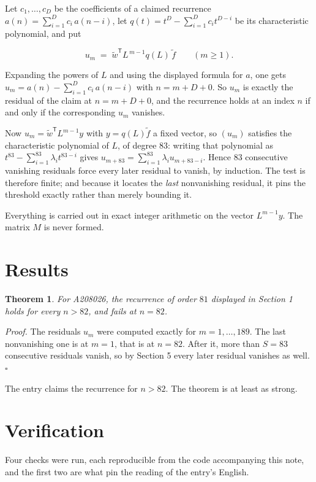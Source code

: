 \documentclass[11pt]{article}
\newtheorem{theorem}{Theorem}
\theoremstyle{definition}
\begin{document}
Let $c_1,\dots,c_D$ be the coefficients of a claimed recurrence $a(n) = \sum_{i=1}^{D} c_i\,a(n-i)$, let $q(t) = t^{D} - \sum_{i=1}^{D} c_i t^{D-i}$ be its characteristic polynomial, and put

\[u_m \;=\; \tilde w^{\mathsf T} L^{\,m-1} q(L)\,\tilde f \qquad (m \ge 1).\]

Expanding the powers of $L$ and using the displayed formula for $a$, one gets $u_m = a(n) - \sum_{i=1}^{D} c_i\,a(n-i)$ with $n = m + D + 0$. So $u_m$ is exactly the residual of the claim at $n = m + D + 0$, and the recurrence holds at an index $n$ if and only if the corresponding $u_m$ vanishes.

Now $u_m = \tilde w^{\mathsf T} L^{m-1} y$ with $y = q(L)\tilde f$ a fixed vector, so $(u_m)$ satisfies the characteristic polynomial of $L$, of degree $83$: writing that polynomial as $t^{83} - \sum_{i=1}^{83} \lambda_i t^{83-i}$ gives $u_{m+83} = \sum_{i=1}^{83} \lambda_i u_{m+83-i}$. Hence $83$ consecutive vanishing residuals force every later residual to vanish, by induction. The test is therefore finite; and because it locates the {\itshape last} nonvanishing residual, it pins the threshold exactly rather than merely bounding it.

Everything is carried out in exact integer arithmetic on the vector $L^{m-1}y$. The matrix $M$ is never formed.

\section{Results}

\begin{theorem} For A208026, the recurrence of order $81$ displayed in Section 1 holds for every $n > 82$, and fails at $n = 82$.\end{theorem}

{\itshape Proof.} The residuals $u_m$ were computed exactly for $m = 1,\dots,189$. The last nonvanishing one is at $m = 1$, that is at $n = 82$. After it, more than $S = 83$ consecutive residuals vanish, so by Section 5 every later residual vanishes as well. $\square$

The entry claims the recurrence for $n > 82$. The theorem is at least as strong.

\section{Verification}

Four checks were run, each reproducible from the code accompanying this note, and the first two are what pin the reading of the entry's English.
\end{document}
